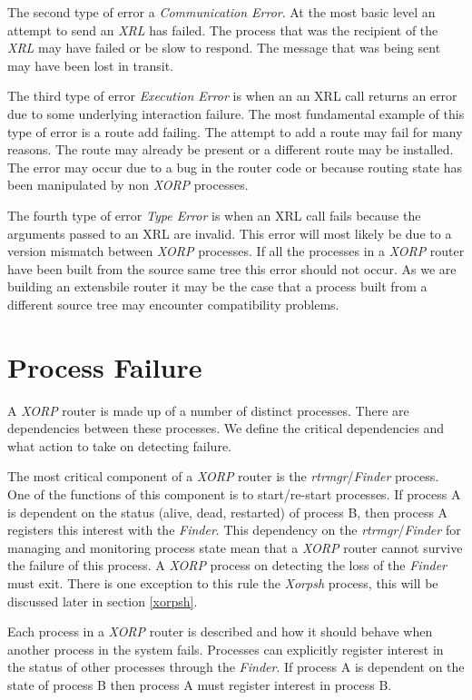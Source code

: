 \documentclass[11pt]{article}
\makeatletter
\newcommand{\xorp} {{\em XORP}\@\xspace}
\newcommand{\finder} {{\em Finder}\@\xspace}
\newcommand{\xorpsh} {{\em Xorpsh}\@\xspace}
\newcommand{\xrl} {{\em XRL}\@\xspace}
\newcommand{\rtrmgr} {{\em rtrmgr}\@\xspace}
\makeatother
\begin{document}
The second type of error a {\em Communication Error}. At the most
basic level an attempt to send an \xrl has failed. The process that
was the recipient of the \xrl may have failed or be slow to respond.
The message that was being sent may have been lost in transit.

The third type of error {\em Execution Error} is when an an XRL call
returns an error due to some underlying interaction failure. The most
fundamental example of this type of error is a route add failing. The
attempt to add a route may fail for many reasons. The route may
already be present or a different route may be installed. The error
may occur due to a bug in the router code or because routing state has
been manipulated by non \xorp processes.

The fourth type of error {\em Type Error} is when an XRL call fails
because the arguments passed to an XRL are invalid. This error will
most likely be due to a version mismatch between \xorp processes. If
all the processes in a \xorp router have been built from the source
same tree this error should not occur. As we are building an
extensbile router it may be the case that a process built from a
different source tree may encounter compatibility problems.

\section{\label{pfailure}Process Failure}

A \xorp router is made up of a number of distinct processes. There are
dependencies between these processes. We define the critical
dependencies and what action to take on detecting failure.

The most critical component of a \xorp router is the \rtrmgr/\finder
process. One of the functions of this component is to start/re-start
processes. If process A is dependent on the status (alive, dead,
restarted) of process B, then process A registers this interest with
the \finder. This dependency on the \rtrmgr/\finder for managing and
monitoring process state mean that a \xorp router cannot survive the
failure of this process. A \xorp process on detecting the loss of the
\finder must exit. There is one exception to this rule the \xorpsh
process, this will be discussed later in section \ref{xorpsh}.

Each process in a \xorp router is described and how it should behave
when another process in the system fails. Processes can explicitly
register interest in the status of other processes through the
\finder. If process A is dependent on the state of process B then
process A must register interest in process B.
\end{document}
